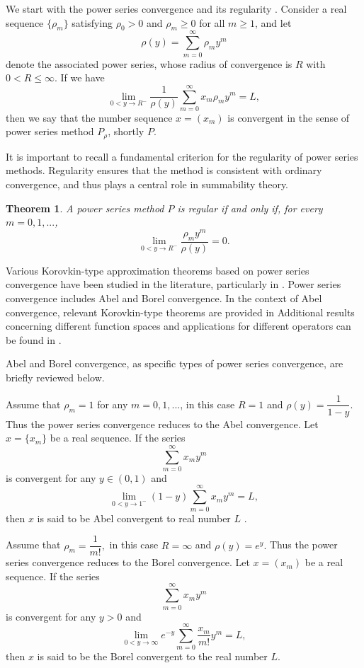 \documentclass{amsart}
\newtheorem{theorem}{Theorem}
\theoremstyle{plain}
\numberwithin{equation}{section}
\begin{document}
We start with the power series convergence and its regularity  \cite{boos}. Consider a real sequence $\{\rho_{m}\}$ satisfying $\rho_{0}>0$ and $\rho_{m}\geq0$ for all $m\geq1$, and let
\[
\rho(y)=\sum_{m=0}^{\infty}\rho_{m}y^{m}
\]
denote the associated power series, whose radius of convergence is $R$ with $0<R\leq\infty$. If we have
\[
\lim_{0<y\rightarrow R^{-}}\frac{1}{\rho(y)}\sum_{m=0}^{\infty}x_{m}\rho
_{m}y^{m}=L,
\]
then we say that the number sequence $x=\left(  x_{m}\right)  $ is convergent in the sense of
power series method $P_{\rho}$, shortly $P$.

It is important to recall a fundamental criterion for the regularity of power series methods. Regularity ensures that the method is consistent with ordinary convergence, and thus plays a central role in summability theory.

\begin{theorem}\cite{boos}
A power series method $P$ is regular if and only if, for every $m=0,1,...$,
\[
\lim_{0<y\rightarrow R^{-}}\frac{\rho_{m}y^{m}}{\rho(y)}=0.
\]

\end{theorem}

Various Korovkin-type approximation theorems based on power series convergence
have been studied in the literature, particularly in \cite{tas-atlihan, tas-yrd-atl2018, yurd-2016}.  Power series convergence includes
Abel and Borel convergence. In the context of Abel convergence, relevant
Korovkin-type theorems are provided in \cite{unver, unver2}
Additional results concerning different function spaces and applications for different operators can be found in
\cite {atlihan-unver,sakaoglu-unver, soy-unver2017, soylemez-unver-2020,soy-2025}. 

Abel and Borel convergence, as specific types of
power series convergence, are briefly reviewed below.

Assume that $\rho_{m}=1$ for any $m=0,1,...$, in this case $R=1$ and $\rho(y)=\dfrac{1}{1-y}.$ Thus the
power series convergence reduces to the Abel convergence. Let $x=\{x_{m}\}$
be a real sequence. If the series
\begin{equation*}
\sum_{m=0}^{\infty}x_{m}y^{m} \label{1d1}%
\end{equation*}
is convergent for any $y\in(0,1)$ and%
\[
\lim_{0<y\rightarrow1^{-}}(1-y)\sum_{m=0}^{\infty}x_{m}y^{m}=L,
\]
then $x$ is said to be Abel convergent to real number $L$ \cite{boos, powell}.

Assume that $\rho_{m}=\dfrac{1}{m!},$ in this case $R=\infty$ and $\rho(y)=e^{y}.$ Thus the power series convergence reduces to the
Borel convergence. Let $x=(x_{m})$ be a real sequence. If the series
\begin{equation*}
\sum_{m=0}^{\infty}x_{m}y^{m}%
\end{equation*}
is convergent for any $y>0$ and
\[
\lim_{0<y\rightarrow \infty}e^{-y}\sum_{m=0}^{\infty}\frac{x_{m}}{m!}%
y^{m}=L,
\]
then $x$ is said to be the Borel convergent to the real number $L$. \cite{boos, powell}
\end{document}
